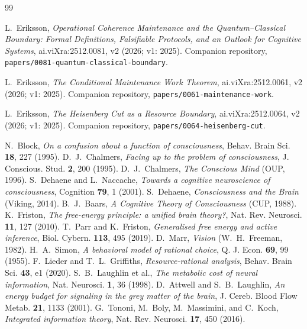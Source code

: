 \documentclass[11pt,a4paper]{article}
\begin{document}
\begin{thebibliography}{99}\small

 L.~Eriksson, \emph{Operational Coherence Maintenance and the
Quantum--Classical Boundary: Formal Definitions, Falsifiable Protocols, and
an Outlook for Cognitive Systems}, ai.viXra:2512.0081, v2 (2026; v1: 2025).
Companion repository, \texttt{papers/0081-quantum-classical-boundary}.

 L.~Eriksson, \emph{The Conditional Maintenance Work Theorem},
ai.viXra:2512.0061, v2 (2026; v1: 2025). Companion repository,
\texttt{papers/0061-maintenance-work}.

 L.~Eriksson, \emph{The Heisenberg Cut as a Resource Boundary},
ai.viXra:2512.0064, v2 (2026; v1: 2025). Companion repository,
\texttt{papers/0064-heisenberg-cut}.

 N.~Block, \emph{On a confusion about a function of
consciousness}, Behav. Brain Sci. \textbf{18}, 227 (1995).
 D.~J.~Chalmers, \emph{Facing up to the problem of
consciousness}, J. Conscious. Stud. \textbf{2}, 200 (1995).
 D.~J.~Chalmers, \emph{The Conscious Mind} (OUP, 1996).
 S.~Dehaene and L.~Naccache, \emph{Towards a
cognitive neuroscience of consciousness}, Cognition \textbf{79}, 1 (2001).
 S.~Dehaene, \emph{Consciousness and the Brain} (Viking,
2014).
 B.~J.~Baars, \emph{A Cognitive Theory of Consciousness}
(CUP, 1988).
 K.~Friston, \emph{The free-energy principle: a unified
brain theory?}, Nat. Rev. Neurosci. \textbf{11}, 127 (2010).
 T.~Parr and K.~Friston, \emph{Generalised free energy
and active inference}, Biol. Cybern. \textbf{113}, 495 (2019).
 D.~Marr, \emph{Vision} (W.~H.~Freeman, 1982).
 H.~A.~Simon, \emph{A behavioral model of rational choice},
Q. J. Econ. \textbf{69}, 99 (1955).
 F.~Lieder and T.~L.~Griffiths,
\emph{Resource-rational analysis}, Behav. Brain Sci. \textbf{43}, e1 (2020).
 S.~B.~Laughlin et al., \emph{The metabolic cost of neural
information}, Nat. Neurosci. \textbf{1}, 36 (1998).
 D.~Attwell and S.~B.~Laughlin, \emph{An energy
budget for signaling in the grey matter of the brain}, J. Cereb. Blood Flow
Metab. \textbf{21}, 1133 (2001).
 G.~Tononi, M.~Boly, M.~Massimini, and C.~Koch,
\emph{Integrated information theory}, Nat. Rev. Neurosci. \textbf{17}, 450
(2016).

\end{thebibliography}
\end{document}
